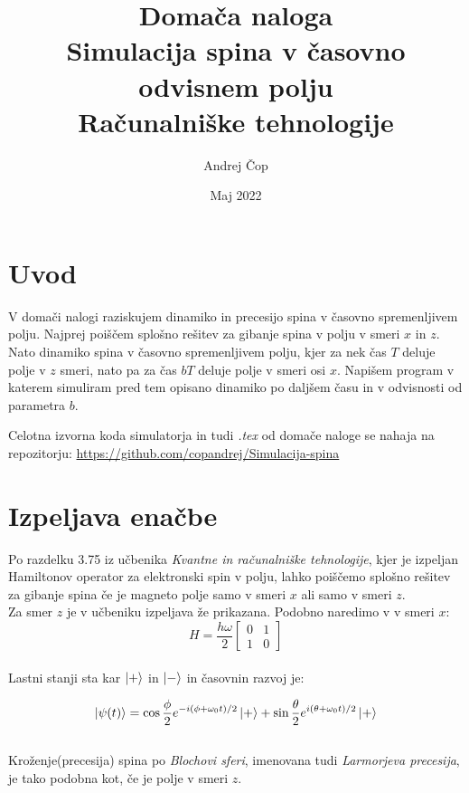 \documentclass[12pt, a4paper]{article}
\title{  Domača naloga\\\large\textbf{Simulacija spina v časovno odvisnem polju}\\
\large Računalniške tehnologije}
\author{Andrej Čop}
\date{Maj 2022}
\begin{document}
\maketitle
\newpage

\tableofcontents
\newpage

\section{Uvod}
V domači nalogi raziskujem dinamiko in precesijo spina v časovno spremenljivem polju. Najprej poiščem splošno rešitev za gibanje spina v polju v smeri $x$ in $z$. Nato dinamiko spina v časovno spremenljivem polju, kjer za nek čas $T$ deluje polje v $z$ smeri, nato pa za čas $bT$ deluje polje v smeri osi $x$. Napišem program v katerem simuliram pred tem opisano dinamiko po daljšem času in v odvisnosti od parametra $b$.

Celotna izvorna koda simulatorja in tudi \textit{.tex} od domače naloge se nahaja na repozitorju: \url{https://github.com/copandrej/Simulacija-spina} 
\section{Izpeljava enačbe}
Po razdelku 3.75 iz učbenika \textit{Kvantne in računalniške tehnologije}, kjer je izpeljan Hamiltonov operator za elektronski spin v polju, lahko poiščemo splošno rešitev za gibanje spina če je magneto polje samo v smeri $x$ ali samo v smeri $z$.\\
Za smer $z$ je v učbeniku izpeljava že prikazana. Podobno naredimo v v smeri $x$:\\
\begin{equation}
H = \frac{h\omega}{2}
\begin{bmatrix}
0 & 1\\
1 & 0
\end{bmatrix}
\end{equation}\\
Lastni stanji sta kar $\ket{+}$ in $\ket{-}$ in časovnin razvoj je:


\begin{equation}
\ket{\psi(t)} = \cos\frac{\phi}{2}e^{-i(\phi+\omega_0 t)/2}\ket{+} + \sin\frac{\theta}{2}e^{i(\theta+\omega_0 t)/2}\ket{+}
\end{equation}\\
Kroženje(precesija) spina po \textit{Blochovi sferi}, imenovana tudi \textit{Larmorjeva precesija}, je tako podobna kot, če je polje v smeri $z$.
\end{document}
